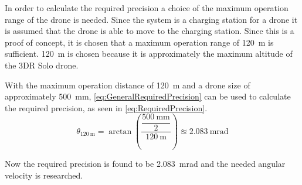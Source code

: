 In order to calculate the required precision a choice of the maximum operation range of the drone is needed. Since the system is a charging station for a drone it is assumed that the drone is able to move to the charging station. Since this is a proof of concept, it is chosen that a maximum operation range of \SI{120}{\meter} is sufficient. \SI{120}{\meter} is chosen because it is approximately the maximum altitude of the 3DR Solo drone. 

With the maximum operation distance of \SI{120}{\meter} and a drone size of approximately \SI{500}{\milli\meter}, \autoref{eq:GeneralRequiredPrecision} can be used to calculate the required precision, as seen in \autoref{eq:RequiredPrecision}. 
\begin{equation}\label{eq:RequiredPrecision}
\theta_{\SI{120}{\meter}} = \arctan \left( \frac{{\dfrac{\SI{500}{\milli\meter}}{2}}}{\SI{120}{\meter}} \right) \approxeq \SI{2,083}{\milli\radian} 
\end{equation}
 

Now the required precision is found to be \SI{2.083}{\milli\radian} and the needed angular velocity is researched.